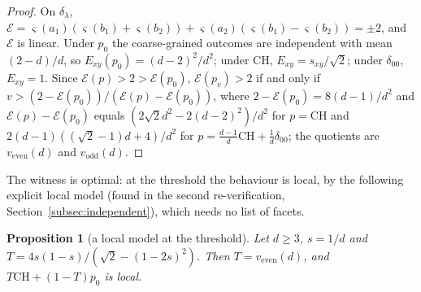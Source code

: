 \documentclass[11pt]{article}
\newtheorem{proposition}[lemma]{Proposition}
\theoremstyle{remark}
\numberwithin{equation}{section}
\newcommand{\cE}{\mathcal{E}}
\newcommand{\veven}{v_{\mathrm{even}}}
\newcommand{\vodd}{v_{\mathrm{odd}}}
\newcommand{\CH}{\mathrm{CH}}
\begin{document}
\begin{proof}
On $\delta_\lambda$, $\cE=\varsigma(a_1)(\varsigma(b_1)+\varsigma(b_2))+\varsigma(a_2)(\varsigma(b_1)-\varsigma(b_2))=\pm2$, and $\cE$ is
linear. Under $p_0$ the coarse-grained outcomes are independent with mean $(2-d)/d$, so $E_{xy}(p_0)=(d-2)^2/d^2$; under
$\CH$, $E_{xy}=s_{xy}/\sqrt2$; under $\delta_{00}$, $E_{xy}=1$. Since $\cE(p)>2>\cE(p_0)$, $\cE(p_v)>2$ if and only if
$v>(2-\cE(p_0))/(\cE(p)-\cE(p_0))$, where $2-\cE(p_0)=8(d-1)/d^2$ and $\cE(p)-\cE(p_0)$ equals $(2\sqrt2d^2-2(d-2)^2)/d^2$
for $p=\CH$ and $2(d-1)((\sqrt2-1)d+4)/d^2$ for $p=\frac{d-1}d\CH+\frac1d\delta_{00}$; the quotients are $\veven(d)$ and
$\vodd(d)$.
\end{proof}

The witness is optimal: at the threshold the behaviour is local, by the following explicit local model (found in the
second re-verification, Section~\ref{subsec:independent}), which needs no list of facets.

\begin{proposition}[a local model at the threshold]\label{prop:flagmodel}
Let $d\ge3$, $s=1/d$ and $T=4s(1-s)/(\sqrt2-(1-2s)^2)$. Then $T=\veven(d)$, and $T\CH+(1-T)p_0$ is local.
\end{proposition}
\end{document}
